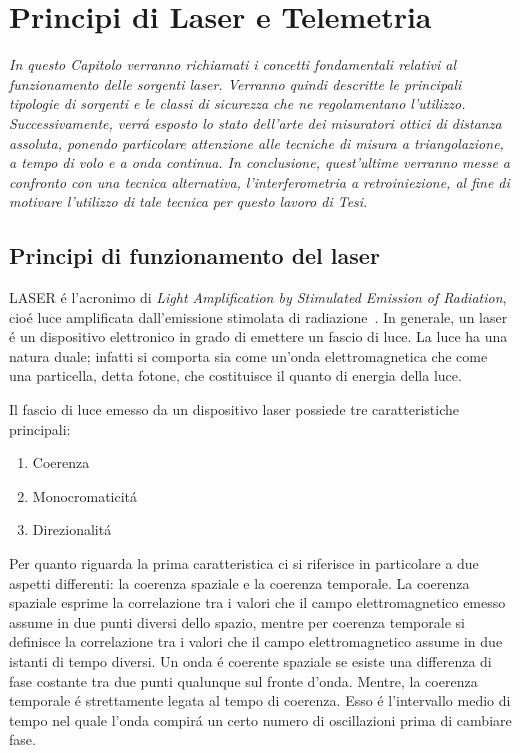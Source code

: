 \chapter{Principi di Laser e Telemetria}
\label{capitolo1}
\thispagestyle{empty}

\textit{In questo Capitolo verranno richiamati i concetti fondamentali relativi al funzionamento delle sorgenti laser. Verranno quindi descritte le principali tipologie di sorgenti e le classi di sicurezza che ne regolamentano l'utilizzo. Successivamente, verr\'a esposto lo stato dell'arte dei misuratori ottici di distanza assoluta, ponendo particolare attenzione alle tecniche di misura a triangolazione, a tempo di volo e a onda continua. In conclusione, quest'ultime verranno messe a confronto con una tecnica alternativa, l'interferometria a retroiniezione, al fine di motivare l'utilizzo di tale tecnica per questo lavoro di Tesi.}

\section{Principi di funzionamento del laser}
LASER \'e l'acronimo di \emph{Light Amplification by Stimulated Emission of Radiation}, cio\'e luce amplificata dall'emissione stimolata di radiazione~\cite{sveltolaser}. In generale, un laser \'e un dispositivo elettronico in grado di emettere un fascio di luce.
La luce ha una natura duale; infatti si comporta sia come un'onda elettromagnetica che come una particella, detta fotone, che costituisce il quanto di energia della luce. 

Il fascio di luce emesso da un dispositivo laser possiede tre caratteristiche principali:
\begin{enumerate}
	\item Coerenza
	\item Monocromaticit\'a
	\item Direzionalit\'a
\end{enumerate}

Per quanto riguarda la prima caratteristica ci si riferisce in particolare a due aspetti differenti: la coerenza spaziale e la coerenza temporale. La coerenza spaziale esprime la correlazione tra i valori che il campo elettromagnetico emesso assume in due punti diversi dello spazio, mentre per coerenza temporale si definisce la correlazione tra i valori che il campo elettromagnetico assume in due istanti di tempo diversi.
Un onda \'e coerente spaziale se esiste una differenza di fase costante tra due punti qualunque sul fronte d'onda. Mentre, la coerenza temporale \'e strettamente legata al tempo di coerenza. Esso \'e l'intervallo medio di tempo nel quale l'onda compir\'a un certo numero di oscillazioni prima di cambiare fase.

